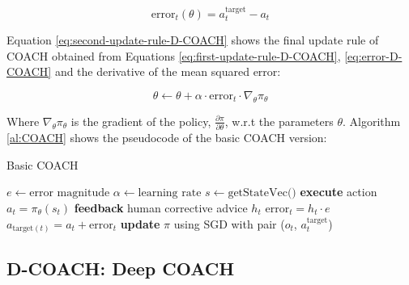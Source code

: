\begin{equation}
\text{error}_t(\theta) = a_t^\text{target} - a_t
\label{eq:error-D-COACH}
\end{equation}


Equation \eqref{eq:second-update-rule-D-COACH} shows the final update rule of COACH obtained from Equations \eqref{eq:first-update-rule-D-COACH}, \eqref{eq:error-D-COACH} and the derivative of the mean squared error:


\begin{equation}
\theta \leftarrow \theta + \alpha \cdot \text{error}_t \cdot \nabla_\theta \pi_\theta
\label{eq:second-update-rule-D-COACH}
\end{equation}



Where $\nabla_\theta \pi_\theta$ is the gradient of the policy, $\frac{\partial \pi}{\partial \theta}$, w.r.t the parameters $\theta$. Algorithm \ref{al:COACH} shows the pseudocode of the basic COACH version:


\begin{algorithm}[H]
\caption{Basic COACH}
\begin{algorithmic}[1]
\State $e \leftarrow \text{error magnitude}$ 
\State $\alpha \leftarrow \text{learning rate}$ 
 {}
\State $s \leftarrow \text{getStateVec()}$
\State \textbf{execute} action $a_{t}=\pi_{\theta}(s_{t})$
\State \textbf{feedback} human corrective advice $h_{t}$
\State $\text{error}_{t} = h_{t}\cdot e$
\State $a_{\text{target}(t)} = a_{t} + \text{error}_{t}$
\State \textbf{update} $\pi$ using SGD with pair ($o_{t}$, $a^{\text{target}}_{t}$)
\EndIf
\EndWhile
\end{algorithmic}
\label{al:COACH}
\end{algorithm}

\subsection{D-COACH: Deep COACH}
\label{subsection:D-COACH}


